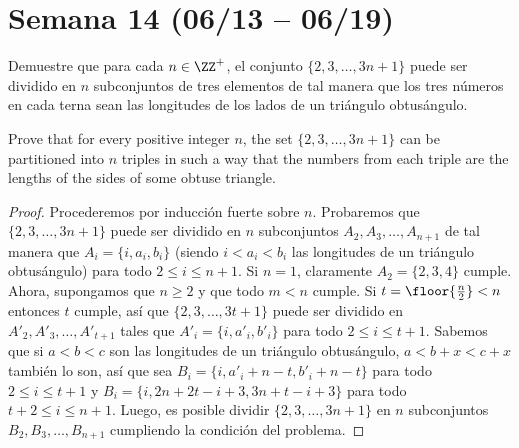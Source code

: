 \section{Semana 14 (06/13 -- 06/19)}


\begin{probHR}[ISL 2011/A5]
	Demuestre que para cada $n\in\ZZ^+$, el conjunto $\{2,3,\dots,3n+1\}$ puede ser dividido en $n$ subconjuntos de tres elementos de tal manera que los tres números en cada terna sean las longitudes de los lados de un triángulo obtusángulo.
	\begin{hint}
		Prove that for every positive integer $n$, the set $\{2,3,\dots,3n+1\}$ can be partitioned into $n$ triples in such a way that the numbers from each triple are the lengths of the sides of some obtuse triangle.
	\end{hint}
\end{probHR}

\begin{proof}
	Procederemos por inducción fuerte sobre $n$. Probaremos que $\{2,3,\dots,3n+1\}$ puede ser dividido en $n$ subconjuntos $A_2,A_3,\dots,A_{n+1}$ de tal manera que $A_i=\{i,a_i,b_i\}$ (siendo $i<a_i<b_i$ las longitudes de un triángulo obtusángulo) para todo $2\le i\le n+1$. Si $n=1$, claramente $A_2=\{2,3,4\}$ cumple. Ahora, supongamos que $n\ge 2$ y que todo $m<n$ cumple. Si $t=\floor{\frac n2}<n$ entonces $t$ cumple, así que $\{2,3,\dots,3t+1\}$ puede ser dividido en $A'_2,A'_3,\dots,A'_{t+1}$ tales que $A'_i=\{i,a'_i,b'_i\}$ para todo $2\le i\le t+1$. Sabemos que si $a<b<c$ son las longitudes de un triángulo obtusángulo, $a<b+x<c+x$ también lo son, así que sea $B_i=\{i,a'_i+n-t,b'_i+n-t\}$ para todo $2\le i\le t+1$ y $B_i=\{i,2n+2t-i+3,3n+t-i+3\}$ para todo $t+2\le i\le n+1$. Luego, es posible dividir $\{2,3,\dots,3n+1\}$ en $n$ subconjuntos $B_2,B_3,\dots,B_{n+1}$ cumpliendo la condición del problema.
\end{proof}

